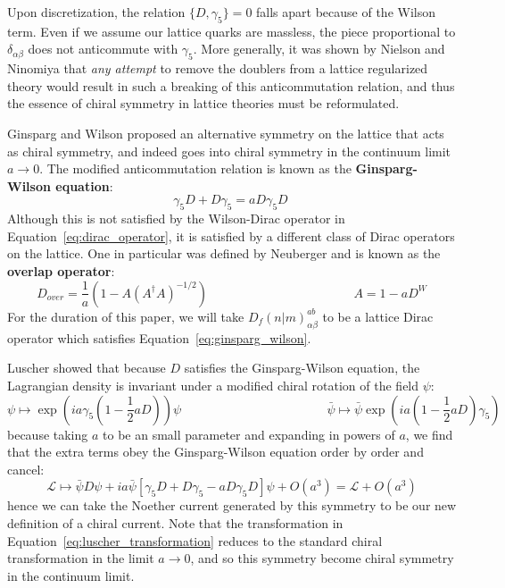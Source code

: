 \documentclass[11pt, oneside]{article}   	%
\theoremstyle{definition}
\begin{document}
Upon discretization, the relation $\{D, \gamma_5\} = 0$ falls apart because of the Wilson term. Even if we assume our lattice 
quarks are massless, the piece proportional to $\delta_{\alpha\beta}$ does not anticommute with $\gamma_5$. More generally, 
it was shown by Nielson and Ninomiya \cite{nogo} that \textit{any attempt} to remove the doublers from a lattice regularized 
theory would result in such a breaking of this anticommutation relation, and thus the essence of chiral symmetry in lattice 
theories must be reformulated. 

Ginsparg and Wilson \cite{ginsparg} proposed an alternative symmetry on the lattice that acts as chiral symmetry, and indeed 
goes into chiral symmetry in the continuum limit $a\rightarrow 0$. The modified anticommutation relation is known as the 
\textbf{Ginsparg-Wilson equation}:
\begin{equation}
	\gamma_5 D + D\gamma_5 = aD\gamma_5 D~
	\label{eq:ginsparg_wilson}
\end{equation}
Although this is not satisfied by the Wilson-Dirac operator in Equation~\ref{eq:dirac_operator}, it is satisfied by a different class 
of Dirac operators on the lattice. One in particular was defined by Neuberger \cite{neuberger} and is known as the 
\textbf{overlap operator}:
\begin{equation}
	D_{over} = \frac{1}{a}\left(1 - A (A^\dagger A)^{-1/2}\right)\;\;\;\;\;\;\;\;\;\;\;\;\;\;\;\;\;\;\;\;\;\;\;\;\;\;\;\;\;\;\;\;\;\;\;\;\;\;\;\;\;\;  
	A = 1 - aD^W
\end{equation}
For the duration of this paper, we will take $D_f(n | m)_{\alpha\beta}^{ab}$ to be a lattice Dirac operator which satisfies 
Equation~\ref{eq:ginsparg_wilson}.

Luscher \cite{luscher} showed that because $D$ satisfies the Ginsparg-Wilson equation, the Lagrangian density is invariant 
under a modified chiral rotation of the field $\psi$:
\begin{equation}
	\psi\mapsto \exp\left(ia\gamma_5 \left(1 - \frac{1}{2}a D\right)\right)\psi
	\;\;\;\;\;\;\;\;\;\;\;\;\;\;\;\;\;\;\;\;\;\;\;\;\;\;\;\;\;\;\;\;\;\;\;\;\;\;\;\;\;\; \bar\psi\mapsto\bar\psi 
	\exp\left(ia\left(1 - \frac{1}{2}aD\right)\gamma_5\right)~
	\label{eq:luscher_transformation}
\end{equation}
because taking $a$ to be an small parameter and expanding in powers of $a$, we find that the extra terms obey the 
Ginsparg-Wilson equation order by order and cancel:
\begin{equation}
	\mathcal L \mapsto \bar\psi D\psi + ia\bar\psi\left[\gamma_5 D + D\gamma_5 - a D\gamma_5 D\right]\psi + O(a^3) = 
	\mathcal L + O(a^3)
\end{equation}
hence we can take the Noether current generated by this symmetry to be our new definition of a chiral current. Note that the 
transformation in Equation~\ref{eq:luscher_transformation} reduces to the standard chiral transformation in the limit 
$a\rightarrow 0$, and so this symmetry become chiral symmetry in the continuum limit. 
\end{document}
